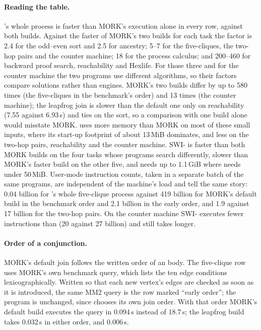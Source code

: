 \paragraph{Reading the table.}  \CeTTa{}'s whole process is faster than MORK's execution alone in every row,
against both builds.  Against the faster of MORK's two builds for each task the
factor is 2.4 for the odd--even sort and 2.5 for ancestry; 5--7 for the
five-cliques, the two-hop pairs and the counter machine; 18 for the process
calculus; and 200--460 for backward proof search, reachability and Hexlife.
For those three and for the counter machine the two programs use different
algorithms, so their factors compare solutions rather than engines.  MORK's
two builds differ by up to 580 times (the five-cliques in the benchmark's order)
and 13 times (the counter machine); the leapfrog join is slower than the default
one only on reachability (7.55 against 6.93\,s) and ties on the sort, so a
comparison with one build alone would misstate MORK.  \CeTTa{} uses more memory than MORK on most of these
small inputs, where its start-up footprint of about 13\,MiB dominates, and less
on the two-hop pairs, reachability and the counter machine.  SWI-\PeTTa{} is
faster than both MORK builds on the four tasks whose \PeTTa{} programs search
differently, slower than MORK's faster build on the other five, and needs up to
1.1\,GiB where \CeTTa{} needs under 50\,MiB.  User-mode instruction counts,
taken in a separate batch of the same programs, are independent of the
machine's load and tell the same story: 0.04 billion for \CeTTa{}'s whole
five-clique process against 419 billion for MORK's default build in the
benchmark order and 2.1 billion in the early order, and 1.9 against 17 billion
for the two-hop pairs.  On the counter machine SWI-\PeTTa{} executes fewer
instructions than \CeTTa{} (20 against 27 billion) and still takes longer.

\paragraph{Order of a conjunction.}  MORK's default join follows the written
order of an  body.  The five-clique row uses MORK's own benchmark
query, which lists the ten edge conditions lexicographically.  Written so that
each new vertex's edges are checked as soon as it is introduced, the same MM2
query is the row marked ``early order''; the \PeTTa{} program is unchanged,
since \CeTTa{} chooses its own join order.  With that order MORK's default build executes the query in 0.094\,s instead
of 18.7\,s; the leapfrog build takes 0.032\,s in either order, and \CeTTa{}
0.006\,s.

